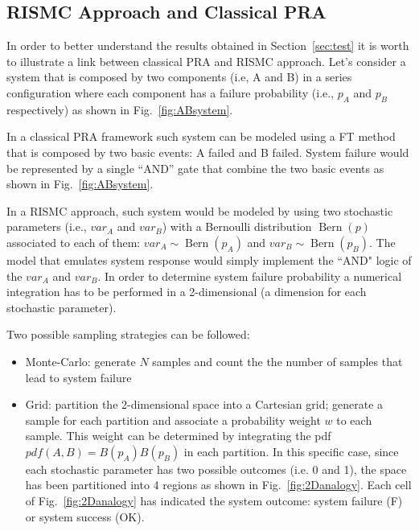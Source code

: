 \subsection{RISMC Approach and Classical PRA}
\label{sec:analogy}

In order to better understand the results obtained in Section~\ref{sec:test} it is worth to illustrate 
a link between classical PRA and RISMC approach.
Let's consider a system that is composed by two components (i.e, A and B) in a series configuration where
each component has a failure probability (i.e., $p_A$ and $p_B$ respectively) as shown in Fig.~\ref{fig:ABsystem}.

In a classical PRA framework such system can be modeled using a FT method that is composed by two basic events:
A failed and B failed.
System failure would be represented by a single ``AND'' gate that combine the two basic events as shown in 
Fig.~\ref{fig:ABsystem}.

In a RISMC approach, such system would be modeled by using two stochastic parameters (i.e., $var_A$ and $var_B$)
with a Bernoulli distribution $\operatorname{Bern}(p)$ associated to each of them: 
$var_A \sim \operatorname{Bern}(p_A)$ and $var_B \sim \operatorname{Bern}(p_B)$. 
The model that emulates system response would simply implement the ``AND" logic of the $var_A$ and $var_B$. 
In order to determine system failure probability a numerical integration has to be performed in a 2-dimensional 
(a dimension for each stochastic parameter).

Two possible sampling strategies can be followed:
\begin{itemize}
  \item Monte-Carlo: generate $N$ samples and count the the number of samples that lead to system failure
  \item Grid: partition the 2-dimensional space into a Cartesian grid; generate a sample for each partition 
        and associate a probability weight $w$ to each sample. This weight can be determined by integrating the pdf
        $pdf(A,B) = B(p_A) B(p_B)$ in each partition. In this specific case, since each stochastic parameter 
        has two possible outcomes (i.e. 0 and 1), the space has been partitioned into 4 regions as 
        shown in Fig.~\ref{fig:2Danalogy}. Each cell of Fig.~\ref{fig:2Danalogy} has indicated the system outcome:
        system failure (F) or system success (OK).
\end{itemize}

